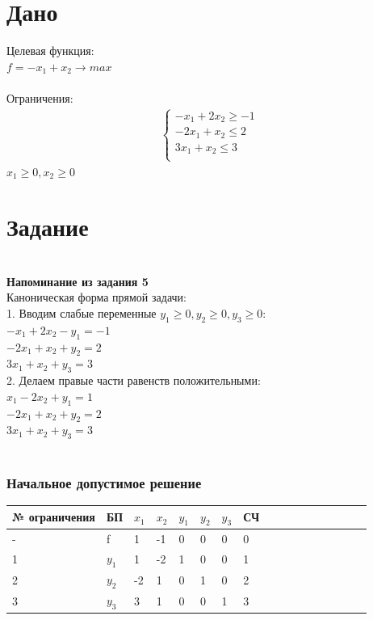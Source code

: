 \documentclass[14pt,a4paper,fleqn]{extarticle}
\begin{document}
\section*{Дано}
Целевая функция:\\
$f = -x_1+x_2 \longrightarrow max$\\\\
Ограничения:
\begin{align*}
	\begin{cases}
		-x_1 + 2x_2 \geq -1\\
		-2x_1 + x_2 \leq 2\\
		3x_1 + x_2 \leq 3\\
	\end{cases}
\end{align*}
$x_1 \geq 0, x_2 \geq 0$

\section*{Задание}
\noindent\makebox[\linewidth]{\rule{\paperwidth}{0.4pt}}\\
\textbf{Напоминание из задания 5}\\
Каноническая форма прямой задачи:\\
1. Вводим слабые переменные $y_1 \geq 0, y_2 \geq 0, y_3 \geq 0$:\\
$-x_1 + 2x_2 - y_1 = -1$\\
$-2x_1 + x_2 + y_2 = 2$\\
$3x_1 + x_2 + y_3 = 3$\\

2. Делаем правые части равенств положительными:\\
$x_1 - 2x_2 + y_1 = 1$\\
$-2x_1 + x_2 + y_2 = 2$\\
$3x_1 + x_2 + y_3 = 3$\\
\noindent\makebox[\linewidth]{\rule{\paperwidth}{0.4pt}}\\
\newpage

\subsubsection*{Начальное допустимое решение}
\begin{tabularx}{\textwidth}{V{1}p{3.15cm}V{1}p{1.2cm}V{1}p{1.2cm}V{1}p{1.2cm}V{1}p{1.26cm}V{1}p{1.2cm}V{1}p{1.2cm}V{1}p{1.2cm}V{1}}
	\hline
	\small № ограничения & БП & $x_1$ & $x_2$ & $y_1$ & $y_2$ & $y_3$ & СЧ\\
	\hline
	- & f & 1 & -1 & 0 & 0 & 0 & 0\\
	 & $y_1$ & 1 & -2 & 1 & 0 & 0 & 1\\
	 & $y_2$ & -2 & 1 & 0 & 1 & 0 & 2\\
	 & $y_3$ & 3 & 1 & 0 & 0 & 1 & 3\\
	\hline
\end{tabularx}
\end{document}
